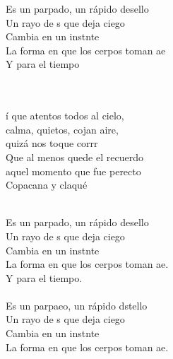\begin{cancion}[Copacabana][Izal]
	\begin{chorus}%
	Es un parpado, un rápido desello\\
	Un rayo de s que deja ciego\\
	Cambia en un instnte\\
	La forma en que los cerpos toman ae\\
Y para el tiempo\\
	\end{chorus}%
	\jump\\
	  \\
	í que atentos todos al cielo, \\
calma, quietos, cojan aire, \\
	quizá nos toque corrr\\
Que al menos quede el recuerdo\\
	 aquel momento que fue perecto\\
	Copacana y claqué  \\\jump\\
	\begin{chorus}%
	Es un parpado, un rápido desello\\
	Un rayo de s que deja ciego\\
	Cambia en un instnte\\
	La forma en que los cerpos toman ae.\\
Y para el tiempo.\\
\jump\\
	Es un parpaeo, un rápido dstello\\
	Un rayo de s que deja ciego\\
	Cambia en un instnte\\
	La forma en que los cerpos toman ae.\\
	\end{chorus}%
	\jump\\
\end{cancion}%
